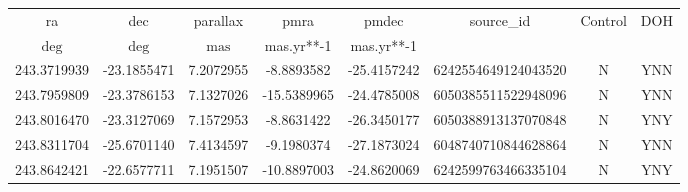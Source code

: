 \begin{table}
\begin{tabular}{cccccccc}
ra & dec & parallax & pmra & pmdec & source_id & Control & DOH \\
$\mathrm{deg}$ & $\mathrm{deg}$ & $\mathrm{mas}$ & mas.yr**-1 & mas.yr**-1 &  &  &  \\
243.3719939 & -23.1855471 & 7.2072955 & -8.8893582 & -25.4157242 & 6242554649124043520 & N & YNN \\
243.7959809 & -23.3786153 & 7.1327026 & -15.5389965 & -24.4785008 & 6050385511522948096 & N & YNN \\
243.8016470 & -23.3127069 & 7.1572953 & -8.8631422 & -26.3450177 & 6050388913137070848 & N & YNY \\
243.8311704 & -25.6701140 & 7.4134597 & -9.1980374 & -27.1873024 & 6048740710844628864 & N & YNN \\
243.8642421 & -22.6577711 & 7.1951507 & -10.8897003 & -24.8620069 & 6242599763466335104 & N & YNY \\
\end{tabular}
\end{table}
